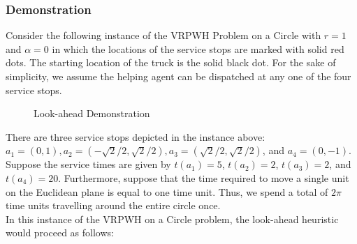 \documentclass[12pt]{scrartcl}
\begin{document}
\subsubsection{Demonstration}
Consider the following instance of the VRPWH Problem on a Circle with $r = 1$ and $\alpha = 0$ in which the locations of the service stops are marked with solid red dots. The starting location of the truck is the solid black dot. For the sake of simplicity, we assume the helping agent can be dispatched at any one of the four service stops. 

\begin{figure}[H]
\centering
{}
\caption{Look-ahead Demonstration}
\end{figure}

There are three service stops depicted in the instance above: $a_1 = (0, 1), a_2 = (-\sqrt{2}/2, \sqrt{2}/2), a_3 = (\sqrt{2}/2, \sqrt{2}/2)$, and $a_4 = (0, -1)$. Suppose the service times are given by $t(a_1) = 5$, $t(a_2) = 2$,  $t(a_3) = 2$, and $t(a_4) = 20$.  Furthermore, suppose that the time required to move a single unit on the Euclidean plane is equal to one time unit. Thus, we spend a total of $2\pi$ time units travelling around the entire circle once. \\

In this instance of the VRPWH on a Circle problem, the look-ahead heuristic would proceed as follows:
\end{document}
